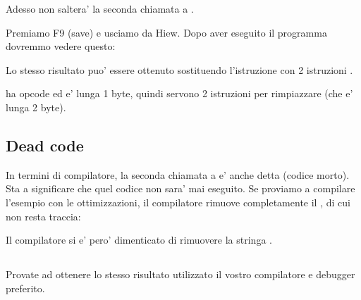 Adesso \JMP non saltera' la seconda chiamata a \printf.

Premiamo F9 (save) e usciamo da Hiew. Dopo aver eseguito il programma dovremmo vedere questo:



Lo stesso risultato puo' essere ottenuto sostituendo l'istruzione \JMP con 2 istruzioni \NOP.

\NOP ha opcode  ed e' lunga 1 byte, quindi servono 2 istruzioni per rimpiazzare \JMP (che e' lunga 2 byte).

\subsection{Dead code}

In termini di compilatore, la seconda chiamata a \printf e' anche detta  (codice morto).
Sta a significare che quel codice non sara' mai eseguito. Se proviamo a compilare l'esempio con le ottimizzazioni, il compilatore
rimuove completamente il , di cui non resta traccia:



Il compilatore si e' pero' dimenticato di rimuovere la stringa .


\subsection{\Exercise}


Provate ad ottenere lo stesso risultato utilizzato il vostro compilatore e debugger preferito.
